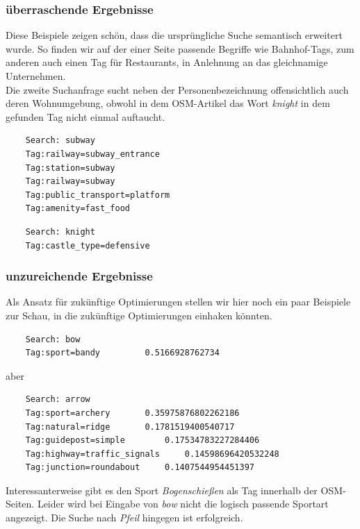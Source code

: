 \documentclass[12pt,pdftex,a4paper]{article}
\begin{document}
\subsubsection{überraschende Ergebnisse}
Diese Beispiele zeigen schön, dass die ursprüngliche Suche semantisch erweitert wurde. So finden wir auf der einer Seite passende Begriffe wie Bahnhof-Tags, zum anderen auch einen Tag für Restaurants, in Anlehnung an das gleichnamige Unternehmen.\\
Die zweite Suchanfrage sucht neben der Personenbezeichnung offensichtlich auch deren Wohnumgebung, obwohl in dem OSM-Artikel das Wort \textit{knight} in dem gefunden Tag nicht einmal auftaucht.
\begin{minipage}[t]{0.45\linewidth}
\begin{lstlisting}
	Search: subway
	Tag:railway=subway_entrance
	Tag:station=subway
	Tag:railway=subway
	Tag:public_transport=platform
	Tag:amenity=fast_food
\end{lstlisting}
\end{minipage}
\begin{minipage}[t]{0.45\linewidth}
\begin{lstlisting}
	Search: knight
	Tag:castle_type=defensive
\end{lstlisting}
\end{minipage}


\subsubsection{unzureichende Ergebnisse}
Als Ansatz für zukünftige Optimierungen stellen wir hier noch ein paar Beispiele zur Schau, in die zukünftige Optimierungen einhaken könnten.
\begin{lstlisting}
	Search: bow
	Tag:sport=bandy 	 	0.5166928762734
\end{lstlisting}
aber
\begin{lstlisting}
	Search: arrow
	Tag:sport=archery 	 	0.35975876802262186
	Tag:natural=ridge 	 	0.1781519400540717
	Tag:guidepost=simple 	 	0.17534783227284406
	Tag:highway=traffic_signals 	0.14598696420532248
	Tag:junction=roundabout 	0.1407544954451397
\end{lstlisting}
Interessanterweise gibt es den Sport \textit{Bogenschießen} als Tag innerhalb der OSM-Seiten. Leider wird bei Eingabe von \textit{bow} nicht die logisch passende Sportart angezeigt. Die Suche nach \textit{Pfeil} hingegen ist erfolgreich.
\end{document}
